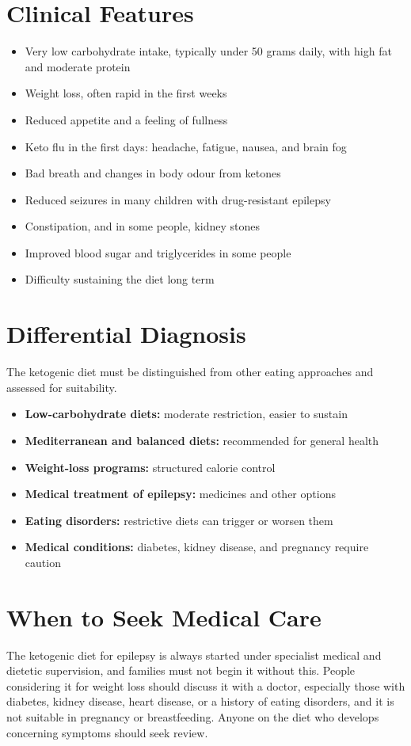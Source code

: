 \section*{Clinical Features}
\begin{itemize}
    \item Very low carbohydrate intake, typically under 50 grams daily, with high fat and moderate protein
    \item Weight loss, often rapid in the first weeks
    \item Reduced appetite and a feeling of fullness
    \item Keto flu in the first days: headache, fatigue, nausea, and brain fog
    \item Bad breath and changes in body odour from ketones
    \item Reduced seizures in many children with drug-resistant epilepsy
    \item Constipation, and in some people, kidney stones
    \item Improved blood sugar and triglycerides in some people
    \item Difficulty sustaining the diet long term
\end{itemize}

\section*{Differential Diagnosis}
The ketogenic diet must be distinguished from other eating approaches and assessed for suitability.
\begin{itemize}
    \item \textbf{Low-carbohydrate diets:} moderate restriction, easier to sustain
    \item \textbf{Mediterranean and balanced diets:} recommended for general health
    \item \textbf{Weight-loss programs:} structured calorie control
    \item \textbf{Medical treatment of epilepsy:} medicines and other options
    \item \textbf{Eating disorders:} restrictive diets can trigger or worsen them
    \item \textbf{Medical conditions:} diabetes, kidney disease, and pregnancy require caution
\end{itemize}

\section*{When to Seek Medical Care}
The ketogenic diet for epilepsy is always started under specialist medical and dietetic supervision, and families must not begin it without this. People considering it for weight loss should discuss it with a doctor, especially those with diabetes, kidney disease, heart disease, or a history of eating disorders, and it is not suitable in pregnancy or breastfeeding. Anyone on the diet who develops concerning symptoms should seek review.

